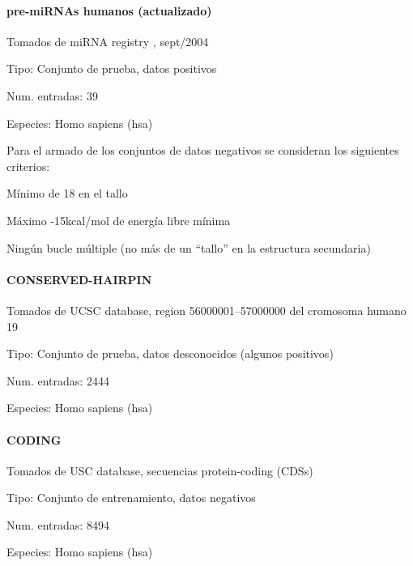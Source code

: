 \documentclass[12pt,bibliography=openstyle,DIV=12,parskip=half-]{scrartcl}
\begin{document}
\paragraph{pre-miRNAs humanos (actualizado)}
Tomados de miRNA registry , sept/2004
\begin{description*}
\item[Tipo:] Conjunto de prueba, datos positivos
\item[Num. entradas:] 39
\item[Especies:]  Homo sapiens (hsa)
\end{description*}

\bigskip
Para el armado de los conjuntos de datos negativos se consideran los
siguientes criterios:
\begin{itemize*}
\item Mínimo de 18  en el tallo
\item Máximo -15kcal/mol de energía libre mínima
\item Ningún bucle múltiple (no más de un ``tallo'' en la estructura
  secundaria)
\end{itemize*}

\paragraph{CONSERVED-HAIRPIN}
Tomados de UCSC database, region 56000001--57000000 del cromosoma
humano 19
\begin{description*}
\item[Tipo:] Conjunto de prueba, datos desconocidos (algunos
  positivos)
\item[Num. entradas:] 2444
\item[Especies:]  Homo sapiens (hsa)
\end{description*}
\paragraph{CODING}
Tomados de USC database, secuencias protein-coding (CDSs)
\begin{description*}
\item[Tipo:] Conjunto de entrenamiento, datos negativos
\item[Num. entradas:] 8494
\item[Especies:]  Homo sapiens (hsa)
\end{description*}
%
%
%
%
%
\end{document}
